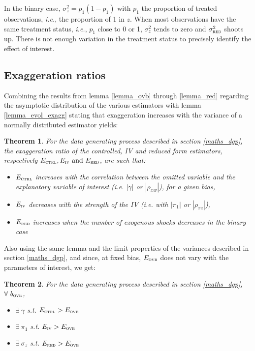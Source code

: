 \documentclass[usletter, 12pt]{article}
\newtheorem{theorem}{Theorem}
\begin{document}
				In the binary case, $\sigma_{z}^{2} = p_{1}(1-p_{1})$ with $p_{1}$ the proportion of treated observations, \textit{i.e.}, the proportion of 1 in $z$. When most observations have the same treatment status, \textit{i.e.}, $p_{1}$ close to 0 or 1, $\sigma_{z}^{2}$ tends to zero and $\sigma_{\textsc{red}}^{2}$ shoots up. There is not enough variation in the treatment status to precisely identify the effect of interest. 
				
		\subsection{Exaggeration ratios}
		
			Combining the results from lemma \ref{lemma_ovb} through \ref{lemma_red}  regarding the asymptotic distribution of the various estimators with lemma \ref{lemma_evol_exagg} stating that exaggeration increases with the variance of a normally distributed estimator yields:
			~
			\begin{theorem}
				For the data generating process described in section \ref{maths_dgp}, the exaggeration ratio of the controlled, IV and reduced form estimators, respectively $E_{\textsc{ctrl}}, E_{\textsc{iv}} \text{ and } E_{\textsc{red}}$, are such that:
					\begin{itemize}
						\item $E_{\textsc{ctrl}}$ increases with the correlation between the omitted variable and the explanatory variable of interest (\textit{i.e.} $|\gamma|$ or $|\rho_{xw}|$), for a given bias,
						\item $E_{\textsc{iv}}$ decreases with the strength of the IV (\textit{i.e.} with $|\pi_{1}|$ or $|\rho_{xz}|$),
						\item $E_{\textsc{red}}$ increases when the number of exogenous shocks decreases in the binary case
					\end{itemize}
			\end{theorem}
			
			Also using the same lemma and the limit properties of the variances described in section \ref{maths_dgp}, and since, at fixed bias, $E_{\textsc{ovb}}$ does not vary with the parameters of interest, we get:
			~
			\begin{theorem}
				For the data generating process described in section \ref{maths_dgp}, $\forall \ b_{\textsc{ovb}}$,
					\begin{itemize}
						\item $\exists \ \gamma$ s.t. $E_{\textsc{ctrl}} > E_{\textsc{ovb}}$
						\item $\exists \ \pi_{1}$ s.t. $E_{\textsc{iv}} > E_{\textsc{ovb}}$
						\item $\exists \ \sigma_{z}$ s.t. $E_{\textsc{red}} > E_{\textsc{ovb}}$
					\end{itemize}
			\end{theorem}
			
\end{document}
